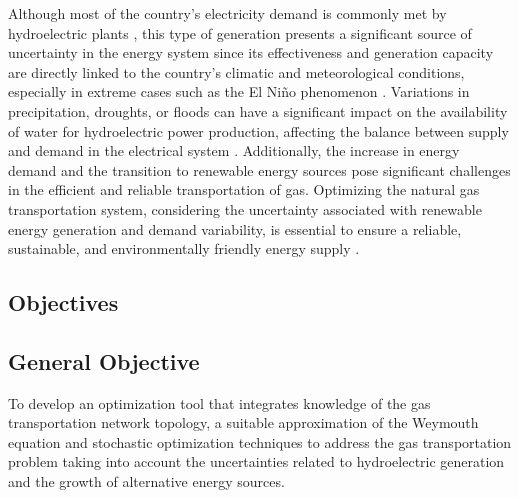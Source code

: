 Although most of the country's electricity demand is commonly met by hydroelectric plants \cite{Arango-Aramburo_Turner_Daenzer_Ríos-Ocampo_Hejazi_Kober_Álvarez-Espinosa_Romero-Otalora_vanderZwaan_2019}, this type of generation presents a significant source of uncertainty in the energy system since its effectiveness and generation capacity are directly linked to the country's climatic and meteorological conditions, especially in extreme cases such as the El Niño phenomenon \cite{Villa-Loaiza_Taype-Huaman_Benavides-Franco_Buenaventura-Vera_Carabalí-Mosquera_2023}. Variations in precipitation, droughts, or floods can have a significant impact on the availability of water for hydroelectric power production, affecting the balance between supply and demand in the electrical system \cite{Ignacio_Fariza_2022}. Additionally, the increase in energy demand and the transition to renewable energy sources pose significant challenges in the efficient and reliable transportation of gas. Optimizing the natural gas transportation system, considering the uncertainty associated with renewable energy generation and demand variability, is essential to ensure a reliable, sustainable, and environmentally friendly energy supply \cite{Shan_Yu_Gong_Huang_Wen_Wang_Ren_Wang_Shi_Liu_2023}.
    



\subsection{Objectives}

\subsection{General Objective}
To develop an optimization tool that integrates knowledge of the gas transportation network topology, a suitable approximation of the Weymouth equation and stochastic optimization techniques to address the gas transportation problem taking into account the uncertainties related to hydroelectric generation and the growth of alternative energy sources.

